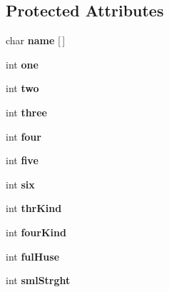 \subsection*{Protected Attributes}
\begin{DoxyCompactItemize}
\item 
\mbox{\label{classscre_card_a142a055fa3894891503722f06c691a4d}} 
char {\bfseries name} \mbox{[}$\,$\mbox{]}
\item 
\mbox{\label{classscre_card_aca36017ce3ff1201a38b9c975c20d242}} 
int {\bfseries one}
\item 
\mbox{\label{classscre_card_a5d802886236a00e701bb68c5ba7de71e}} 
int {\bfseries two}
\item 
\mbox{\label{classscre_card_a44b505ee324fb103931d5a1e2ce9b5d1}} 
int {\bfseries three}
\item 
\mbox{\label{classscre_card_ad9586f49eeb39857826c114c5c1a65cb}} 
int {\bfseries four}
\item 
\mbox{\label{classscre_card_a39fb932db642a35d5dd156045dea5c62}} 
int {\bfseries five}
\item 
\mbox{\label{classscre_card_ae82cf09db1ccd36380a509f240b71040}} 
int {\bfseries six}
\item 
\mbox{\label{classscre_card_a5af84c119b4f58da73e851e18dfb7ae6}} 
int {\bfseries thr\+Kind}
\item 
\mbox{\label{classscre_card_ac76f9907ba8e2795968cd06042a98c42}} 
int {\bfseries four\+Kind}
\item 
\mbox{\label{classscre_card_a4a2ecf756a6e0bc87e4e049941ab40e9}} 
int {\bfseries ful\+Huse}
\item 
\mbox{\label{classscre_card_a7c159f368baece5e9486c95a17243f52}} 
int {\bfseries sml\+Strght}
\item 
\mbox{\label{classscre_card_a337ee925dc5831958deb35df999272de}} 

\end{DoxyCompactItemize}
